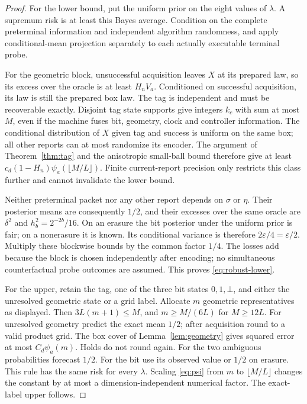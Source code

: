 \begin{proof}
For the lower bound, put the uniform prior on the eight values of $\lambda$. A supremum risk is at least this Bayes average. Condition on the complete preterminal information and independent algorithm randomness, and apply conditional-mean projection separately to each actually executable terminal probe.

For the geometric block, unsuccessful acquisition leaves $X$ at its prepared law, so its excess over the oracle is at least $H_nV_a$. Conditioned on successful acquisition, its law is still the prepared box law. The tag is independent and must be recoverable exactly. Disjoint tag state supports give integers $k_c$ with sum at most $M$, even if the machine fuses bit, geometry, clock and controller information. The conditional distribution of $X$ given tag and success is uniform on the same box; all other reports can at most randomize its encoder. The argument of Theorem~\ref{thm:tag} and the anisotropic small-ball bound therefore give at least $c_d(1-H_n)\psi_a(\lfloor M/L\rfloor)$. Finite current-report precision only restricts this class further and cannot invalidate the lower bound.

Neither preterminal packet nor any other report depends on $\sigma$ or $\eta$. Their posterior means are consequently $1/2$, and their excesses over the same oracle are $\delta^2$ and $h_b^2=2^{-2b}/16$. On an erasure the bit posterior under the uniform prior is fair; on a nonerasure it is known. Its conditional variance is therefore $2\varepsilon/4=\varepsilon/2$. Multiply these blockwise bounds by the common factor $1/4$. The losses add because the block is chosen independently after encoding; no simultaneous counterfactual probe outcomes are assumed. This proves \eqref{eq:robust-lower}.

For the upper, retain the tag, one of the three bit states $0,1,\bot$, and either the unresolved geometric state or a grid label. Allocate $m$ geometric representatives as displayed. Then $3L(m+1)\le M$, and $m\ge M/(6L)$ for $M\ge12L$. For unresolved geometry predict the exact mean $1/2$; after acquisition round to a valid product grid. The box cover of Lemma~\ref{lem:geometry} gives squared error at most $C_d\psi_a(m)$. Holds do not round again. For the two ambiguous probabilities forecast $1/2$. For the bit use its observed value or $1/2$ on erasure. This rule has the same risk for every $\lambda$. Scaling \eqref{eq:psi} from $m$ to $\lfloor M/L\rfloor$ changes the constant by at most a dimension-independent numerical factor. The exact-label upper follows.


\end{proof}
